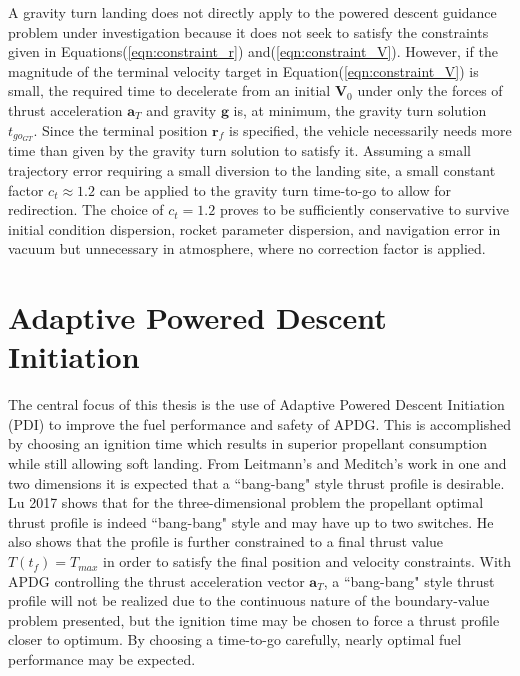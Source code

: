 A gravity turn landing does not directly apply to the powered descent guidance problem under investigation because it does not seek to satisfy the constraints given in Equations\:(\ref{eqn:constraint_r}) and\:(\ref{eqn:constraint_V}). However, if the magnitude of the terminal velocity target in Equation\:(\ref{eqn:constraint_V}) is small, the required time to decelerate from an initial $\bm{V}_0$ under only the forces of thrust acceleration $\bm{a}_T$ and gravity $\bm{g}$ is, at minimum, the gravity turn solution $t_{go_{GT}}$. Since the terminal position $\bm{r}_f$ is specified, the vehicle necessarily needs more time than given by the gravity turn solution to satisfy it. Assuming a small trajectory error requiring a small diversion to the landing site, a small constant factor $ c_t \approx 1.2$ can be applied to the gravity turn time-to-go to allow for redirection. The choice of $c_t = 1.2$ proves to be sufficiently conservative to survive initial condition dispersion, rocket parameter dispersion, and navigation error in vacuum but unnecessary in atmosphere, where no correction factor is applied. 

\section{Adaptive Powered Descent Initiation} \label{sec:PDI}
The central focus of this thesis is the use of Adaptive Powered Descent Initiation (PDI) to improve the fuel performance and safety of APDG. This is accomplished by choosing an ignition time which results in superior propellant consumption while still allowing soft landing. From Leitmann's\:\cite{LEITMANN} and Meditch's\:\cite{MEDITCH} work in one and two dimensions it is expected that a ``bang-bang" style thrust profile is desirable. Lu 2017 \:\cite{LU} shows that for the three-dimensional problem the propellant optimal thrust profile is indeed ``bang-bang" style and may have up to two switches. He also shows that the profile is further constrained to a final thrust value $T(t_f) = T_{max}$ in order to satisfy the final position and velocity constraints. With APDG controlling the thrust acceleration vector $\bm{a}_T$, a ``bang-bang" style thrust profile will not be realized due to the continuous nature of the boundary-value problem presented, but the ignition time may be chosen to force a thrust profile closer to optimum. By choosing a time-to-go carefully, nearly optimal fuel performance may be expected. 

